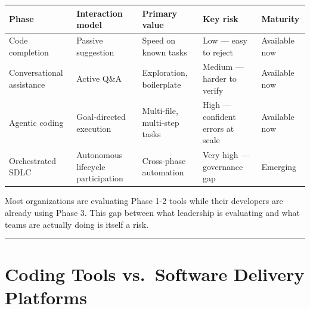 \documentclass[
  a4paper,
  DIV=11,
  numbers=noendperiod]{scrreprt}
\newcounter{none} %
\begin{document}
{\def\LTcaptype{none} %
\begin{longtable}[]{@{}
  >{\raggedright\arraybackslash}p{}
  >{\raggedright\arraybackslash}p{}
  >{\raggedright\arraybackslash}p{}
  >{\raggedright\arraybackslash}p{}
  >{\raggedright\arraybackslash}p{}@{}}
\toprule\noalign{}
\begin{minipage}[b]{\linewidth}\raggedright
Phase
\end{minipage} & \begin{minipage}[b]{\linewidth}\raggedright
Interaction model
\end{minipage} & \begin{minipage}[b]{\linewidth}\raggedright
Primary value
\end{minipage} & \begin{minipage}[b]{\linewidth}\raggedright
Key risk
\end{minipage} & \begin{minipage}[b]{\linewidth}\raggedright
Maturity
\end{minipage} \\
\midrule\noalign{}
\endhead
\bottomrule\noalign{}
\endlastfoot
Code completion & Passive suggestion & Speed on known tasks & Low ---
easy to reject & Available now \\
Conversational assistance & Active Q\&A & Exploration, boilerplate &
Medium --- harder to verify & Available now \\
Agentic coding & Goal-directed execution & Multi-file, multi-step tasks
& High --- confident errors at scale & Available now \\
Orchestrated SDLC & Autonomous lifecycle participation & Cross-phase
automation & Very high --- governance gap & Emerging \\
\end{longtable}
}

Most organizations are evaluating Phase 1-2 tools while their developers
are already using Phase 3. This gap between what leadership is
evaluating and what teams are actually doing is itself a risk.

\begin{center}\rule{0.5\linewidth}{0.5pt}\end{center}

\section{Coding Tools vs.~Software Delivery
Platforms}\label{coding-tools-vs.-software-delivery-platforms}
\end{document}
